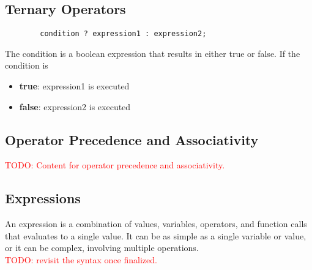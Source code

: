 \documentclass[11pt,A4]{article}
\newcommand{\todo}[1]{\textcolor{red}{#1}}
\begin{document}
        \subsection{Ternary Operators}
        \begin{lstlisting}
        condition ? expression1 : expression2;
        \end{lstlisting}
        The condition is a boolean expression that results in either true or false. If the condition is 
        \begin{itemize}
            \item \textbf{true}: expression1 is executed
            \item \textbf{false}: expression2 is executed
        \end{itemize}
        
        \subsection{Operator Precedence and Associativity}
        \todo{TODO: Content for operator precedence and associativity.}

        \subsection{Expressions}
        An expression is a combination of values, variables, operators, and function calls that evaluates to a single value. It can be as simple as a single variable or value, or it can be complex, involving multiple operations. \\
        \todo{TODO: revisit the syntax once finalized.}
\end{document}
